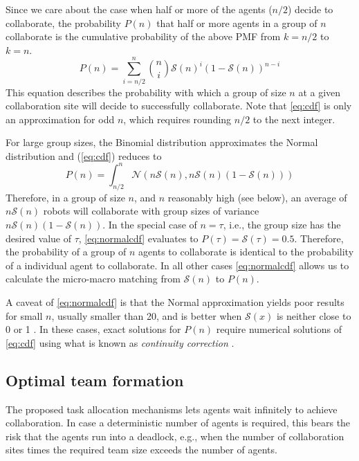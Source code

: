 \documentclass{TeXstyles/DARS/svmult}  %
\newcommand{\sig}{\mathcal{S}}
\begin{document}
Since we care about the case when half or more of the agents ($n/2$) decide to collaborate, the probability $P(n)$ that half or more agents in a group of $n$ collaborate is the cumulative probability of the above PMF from $k = {n/2}$ to $k = n$. 
\begin{equation}
	P(n) = \sum\limits_{i={n/2}}^{n}\binom{n}{i}\sig(n)^{i}\left(1 - \sig(n)\right)^{n - i}\label{eq:cdf}
\end{equation}
This equation describes the probability with which a group of size $n$ at a given collaboration site will decide to successfully collaborate.  Note that \eqref{eq:cdf} is only an approximation for odd $n$, which requires rounding $n/2$ to the next integer. 

For large group sizes, the Binomial distribution approximates the Normal distribution and (\ref{eq:cdf}) reduces to 
\begin{equation}
P(n)=\int_{n/2}^{n} \mathcal{N}(n\sig(n),n\sig(n)(1-\sig(n)))\label{eq:normalcdf}
\end{equation}
Therefore, in a group of size $n$, and $n$ reasonably high (see below), an average of $n\sig(n)$ robots will collaborate with group sizes of variance $n\sig(n)(1-\sig(n))$. In the special case of $n=\tau$, i.e., the group size has the desired value of $\tau$, \eqref{eq:normalcdf} evaluates to $P(\tau) = \sig(\tau)=0.5$. Therefore, the probability of a group of $n$ agents to collaborate is identical to the probability of a individual agent to collaborate. In all other cases \eqref{eq:normalcdf} allows us to calculate the micro-macro matching from $\sig(n)$ to $P(n)$.  

A caveat of \eqref{eq:normalcdf} is that the Normal approximation yields poor results for small $n$, usually smaller than 20, and is better when $\sig(x)$ is neither close to 0 or 1 \cite{box78}. In these cases, exact solutions for $P(n)$ require numerical solutions of \eqref{eq:cdf} using what is known as \emph{continuity correction} \cite{Feller1945}.



\subsection{Optimal team formation}
The proposed task allocation mechanisms lets agents wait infinitely to achieve collaboration. In case a deterministic number of agents is required, this bears the risk that the agents run into a deadlock, e.g., when the number of collaboration sites times the required team size exceeds the number of agents. 
\end{document}
